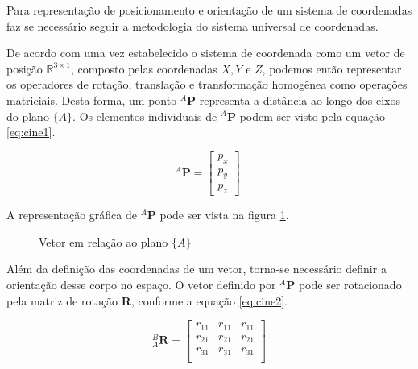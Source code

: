 Para representação de posicionamento e orientação de um sistema de coordenadas faz se necessário seguir a metodologia do sistema universal de coordenadas.

De acordo com \cite{craig2005introduction} uma vez estabelecido o sistema de coordenada como um vetor de posição $\mathbb{R}^{3 \times 1}$, composto pelas coordenadas $X,Y$ e $Z$, podemos então representar os operadores de rotação, translação e transformação homogênea como operações matriciais. Desta forma, um ponto ${}^A\mathbf{P}$ representa a distância ao longo dos eixos do plano $\{A\}$. Os elementos individuais de ${}^A\mathbf{P}$ podem ser visto pela equação \eqref{eq:cine1}.

\begin{equation}\label{eq:cine1}
    {}^A\mathbf{P} = \begin{bmatrix}
    p_x\\ p_y \\ p_z
    \end{bmatrix}.
    \end{equation}
    
    A representação gráfica de ${}^A\mathbf{P}$ pode ser vista na figura \ref{fig:cine1f}. 
    
    \begin{figure}[!ht]
    \centering
    \caption{Vetor em relação ao plano $\{A\}$}
    \label{fig:cine1f}
    \end{figure}
    
    Além da definição das coordenadas de um vetor, torna-se necessário definir a orientação desse corpo no espaço. O vetor definido por ${}^A\mathbf{P}$ pode ser rotacionado pela matriz de rotação $\mathbf{R}$, conforme a equação \eqref{eq:cine2}.
    
    \begin{equation}\label{eq:cine2}
    {}_A^B
    \mathbf{R} = 
    \begin{bmatrix}
    r_{11} & r_{11} & r_{11}\\
    r_{21} & r_{21} & r_{21}\\
    r_{31} & r_{31} & r_{31}\\
    \end{bmatrix}
    \end{equation}


